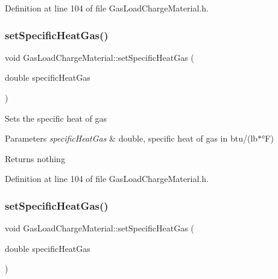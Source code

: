 Definition at line 104 of file Gas\+Load\+Charge\+Material.\+h.

\mbox{\label{class_gas_load_charge_material_a07bf6d4ee9161683fbeb3baad16ea7be}} 
\subsubsection{\texorpdfstring{set\+Specific\+Heat\+Gas()}{setSpecificHeatGas()}\hspace{0.1cm}{\footnotesize\ttfamily [2/3]}}
{\footnotesize\ttfamily void Gas\+Load\+Charge\+Material\+::set\+Specific\+Heat\+Gas (\begin{DoxyParamCaption}\item[{double}]{specific\+Heat\+Gas }\end{DoxyParamCaption})\hspace{0.3cm}{\ttfamily [inline]}}

Sets the specific heat of gas


\begin{DoxyParams}{Parameters}
{\em specific\+Heat\+Gas} & double, specific heat of gas in btu/(lb$\ast$°F)\\
\hline
\end{DoxyParams}
\begin{DoxyReturn}{Returns}
nothing 
\end{DoxyReturn}


Definition at line 104 of file Gas\+Load\+Charge\+Material.\+h.

\mbox{\label{class_gas_load_charge_material_a07bf6d4ee9161683fbeb3baad16ea7be}} 
\subsubsection{\texorpdfstring{set\+Specific\+Heat\+Gas()}{setSpecificHeatGas()}\hspace{0.1cm}{\footnotesize\ttfamily [3/3]}}
{\footnotesize\ttfamily void Gas\+Load\+Charge\+Material\+::set\+Specific\+Heat\+Gas (\begin{DoxyParamCaption}\item[{double}]{specific\+Heat\+Gas }\end{DoxyParamCaption})\hspace{0.3cm}{\ttfamily [inline]}}

